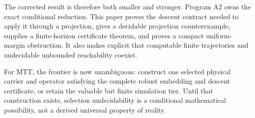 \documentclass[11pt]{article}
\theoremstyle{definition}
\theoremstyle{remark}
\begin{document}
The corrected result is therefore both smaller and stronger.  Program A2 owns
the exact conditional reduction.  This paper proves the descent contract
needed to apply it through a projection, gives a decidable projection
counterexample, supplies a finite-horizon certificate theorem, and proves a
compact uniform-margin obstruction.  It also makes explicit that computable
finite trajectories and undecidable unbounded reachability coexist.

For MTT, the frontier is now unambiguous: construct one selected physical
carrier and operator satisfying the complete robust embedding and descent
certificate, or retain the valuable but finite simulation tier.  Until that
construction exists, selection undecidability is a conditional mathematical
possibility, not a derived universal property of reality.



\end{document}
